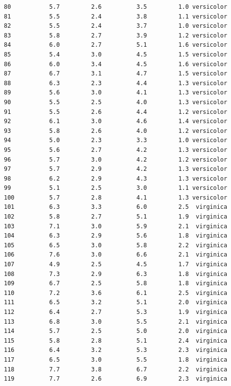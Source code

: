 \documentclass[
  letterpaper,
]{book}
\begin{document}
\begin{verbatim}
80           5.7         2.6          3.5         1.0 versicolor
81           5.5         2.4          3.8         1.1 versicolor
82           5.5         2.4          3.7         1.0 versicolor
83           5.8         2.7          3.9         1.2 versicolor
84           6.0         2.7          5.1         1.6 versicolor
85           5.4         3.0          4.5         1.5 versicolor
86           6.0         3.4          4.5         1.6 versicolor
87           6.7         3.1          4.7         1.5 versicolor
88           6.3         2.3          4.4         1.3 versicolor
89           5.6         3.0          4.1         1.3 versicolor
90           5.5         2.5          4.0         1.3 versicolor
91           5.5         2.6          4.4         1.2 versicolor
92           6.1         3.0          4.6         1.4 versicolor
93           5.8         2.6          4.0         1.2 versicolor
94           5.0         2.3          3.3         1.0 versicolor
95           5.6         2.7          4.2         1.3 versicolor
96           5.7         3.0          4.2         1.2 versicolor
97           5.7         2.9          4.2         1.3 versicolor
98           6.2         2.9          4.3         1.3 versicolor
99           5.1         2.5          3.0         1.1 versicolor
100          5.7         2.8          4.1         1.3 versicolor
101          6.3         3.3          6.0         2.5  virginica
102          5.8         2.7          5.1         1.9  virginica
103          7.1         3.0          5.9         2.1  virginica
104          6.3         2.9          5.6         1.8  virginica
105          6.5         3.0          5.8         2.2  virginica
106          7.6         3.0          6.6         2.1  virginica
107          4.9         2.5          4.5         1.7  virginica
108          7.3         2.9          6.3         1.8  virginica
109          6.7         2.5          5.8         1.8  virginica
110          7.2         3.6          6.1         2.5  virginica
111          6.5         3.2          5.1         2.0  virginica
112          6.4         2.7          5.3         1.9  virginica
113          6.8         3.0          5.5         2.1  virginica
114          5.7         2.5          5.0         2.0  virginica
115          5.8         2.8          5.1         2.4  virginica
116          6.4         3.2          5.3         2.3  virginica
117          6.5         3.0          5.5         1.8  virginica
118          7.7         3.8          6.7         2.2  virginica
119          7.7         2.6          6.9         2.3  virginica

\end{verbatim}
\end{document}
